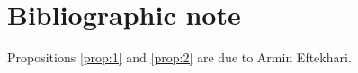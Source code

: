 \section*{Bibliographic note}
Propositions \ref{prop:1} and \ref{prop:2} are due to Armin Eftekhari. 







